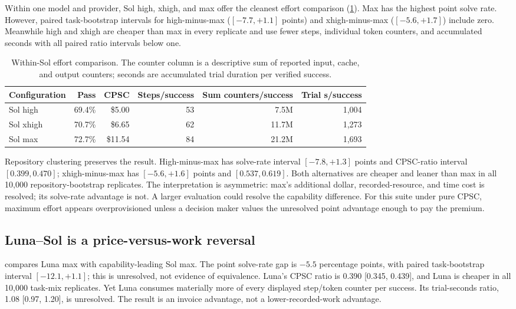 \documentclass[11pt]{article}
\newcommand{\usd}[1]{\$#1}
\begin{document}
Within one model and provider, Sol high, xhigh, and max offer the cleanest effort comparison
(\cref{tab:soleffort}). Max has the highest point solve rate. However, paired task-bootstrap
intervals for high-minus-max ($[-7.7,+1.1]$ points) and xhigh-minus-max ($[-5.6,+1.7]$) include
zero. Meanwhile high and xhigh are cheaper than max in every replicate and use fewer steps,
individual token counters, and accumulated seconds with all paired ratio intervals below one.

\begin{table}[H]
\centering
\scriptsize
\caption{Within-Sol effort comparison. The counter column is a descriptive sum of reported input,
cache, and output counters; seconds are accumulated trial duration per verified success.}
\label{tab:soleffort}
\begin{tabular}{@{}lrrrrr@{}}
\toprule
Configuration & Pass & CPSC & Steps/success & Sum counters/success & Trial s/success \\
\midrule
Sol high & 69.4\% & \usd{5.00} & 53 & 7.5M & 1,004 \\
Sol xhigh & 70.7\% & \usd{6.65} & 62 & 11.7M & 1,273 \\
Sol max & 72.7\% & \usd{11.54} & 84 & 21.2M & 1,693 \\
\bottomrule
\end{tabular}
\end{table}

Repository clustering preserves the result. High-minus-max has solve-rate interval
$[-7.8,+1.3]$ points and CPSC-ratio interval $[0.399,0.470]$; xhigh-minus-max has
$[-5.6,+1.6]$ points and $[0.537,0.619]$. Both alternatives are cheaper and leaner than max in all
10,000 repository-bootstrap replicates. The interpretation is asymmetric: max's additional dollar,
recorded-resource, and time cost is resolved; its solve-rate advantage is not. A larger evaluation
could resolve the capability difference. For this suite under pure CPSC, maximum effort appears
overprovisioned unless a decision maker values the unresolved point advantage enough to pay the
premium.

\subsection{Luna--Sol is a price-versus-work reversal}

 compares Luna max with capability-leading Sol max. The point solve-rate gap is
$-5.5$ percentage points, with paired task-bootstrap interval $[-12.1,+1.1]$; this is unresolved,
not evidence of equivalence. Luna's CPSC ratio is 0.390 [0.345, 0.439], and Luna is cheaper in all
10,000 task-mix replicates. Yet Luna consumes materially more of every displayed step/token
counter per success. Its trial-seconds ratio, 1.08 [0.97, 1.20], is unresolved. The result is an
invoice advantage, not a lower-recorded-work advantage.
\end{document}
